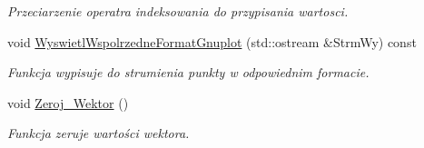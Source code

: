 \begin{DoxyCompactItemize}
\begin{DoxyCompactList}\small\item\em Przeciarzenie operatra indeksowania do przypisania wartosci. \end{DoxyCompactList}\item 
\hypertarget{class_wektor2_d_a8de4d304d91d4f56eb5d0a8ee4b0f50b}{void \hyperlink{class_wektor2_d_a8de4d304d91d4f56eb5d0a8ee4b0f50b}{Wyswietl\+Wspolrzedne\+Format\+Gnuplot} (std\+::ostream \&Strm\+Wy) const }\label{class_wektor2_d_a8de4d304d91d4f56eb5d0a8ee4b0f50b}

\begin{DoxyCompactList}\small\item\em Funkcja wypisuje do strumienia punkty w odpowiednim formacie. \end{DoxyCompactList}\item 
\hypertarget{class_wektor2_d_ac3e6c9b1be273943e7924e61e8010863}{void \hyperlink{class_wektor2_d_ac3e6c9b1be273943e7924e61e8010863}{Zeroj\+\_\+\+Wektor} ()}\label{class_wektor2_d_ac3e6c9b1be273943e7924e61e8010863}

\begin{DoxyCompactList}\small\item\em Funkcja zeruje wartości wektora. \end{DoxyCompactList}\end{DoxyCompactItemize}
